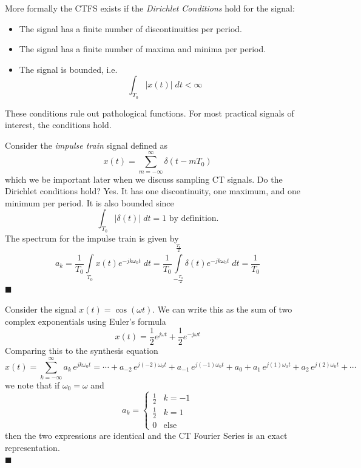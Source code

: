 More formally the CTFS exists if the \emph{Dirichlet Conditions} hold for the signal:

\begin{itemize}
\item The signal has a finite number of discontinuities per period.
\item The signal has a finite number of maxima and minima per period.
\item The signal is bounded, i.e.
  \[
  \int_{T_0} |x(t)| \;dt < \infty
  \]
\end{itemize}

These conditions rule out pathological functions. For most practical signals of interest, the conditions hold.

\begin{example}
  Consider the \emph{impulse train} signal defined as
  \[
  x(t) = \sum\limits_{m = -\infty}^{\infty} \delta(t-mT_0)
  \]
  which we be important later when we discuss sampling CT signals. Do the Dirichlet conditions hold? Yes. It has one discontinuity, one maximum, and one minimum per period. It is also bounded since
  \[
  \int_{T_0} |\delta(t)| \;dt = 1 \mbox{ by definition.}
  \]
  The spectrum for the impulse train is given by
  \[
  a_k = \frac{1}{T_0} \int\limits_{T_0} x(t)e^{-jk\omega_0 t} \; dt =  \frac{1}{T_0} \int\limits_{-\frac{T_0}{2}}^{\frac{T_0}{2}} \delta(t)e^{-jk\omega_0 t} \; dt = \frac{1}{T_0}
  \]
  $\blacksquare$
\end{example}


\begin{example}
  Consider the signal $x(t) = \cos(\omega t)$. We can write this as the sum of two complex exponentials using Euler's formula
  \[
  x(t) = \frac{1}{2}e^{j\omega t} + \frac{1}{2}e^{-j\omega t} 
  \]
  Comparing this to the synthesis equation
  \[
  x(t) = \sum\limits_{k = -\infty}^{\infty} a_k \, e^{j k\omega_0 t} = \cdots + a_{-2} \, e^{j (-2)\omega_0 t} + a_{-1} \, e^{j (-1)\omega_0 t} + a_0 + a_{1} \, e^{j (1)\omega_0 t} + a_{2} \, e^{j (2)\omega_0 t} + \cdots
  \]
  we note that if $\omega_0 = \omega$ and 
  \[
  a_k = \left\{ \begin{array}{lc}
    \tfrac{1}{2} & k = -1\\[0.5em]
    \tfrac{1}{2} & k = 1\\[0.5em]
    0 & \text{else}
  \end{array}
  \right.
  \]
  then the two expressions are identical and the CT Fourier Series is an exact representation.\\
  $\blacksquare$
\end{example}

